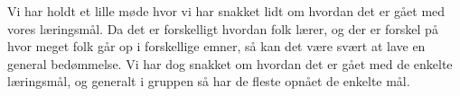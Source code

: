 Vi har holdt et lille m\o{}de hvor vi har snakket lidt om hvordan det er g\aa{}et med vores l\ae{}ringsm\aa{}l. Da det er forskelligt hvordan folk l\ae{}rer, og der er forskel p\aa{} hvor meget folk g\aa{}r op i forskellige emner, s\aa{} kan det v\ae{}re sv\ae{}rt at lave en general bed\o{}mmelse. Vi har dog snakket om hvordan det er g\aa{}et med de enkelte l\ae{}ringsm\aa{}l, og generalt i gruppen s\aa{} har de fleste opn\aa{}et de enkelte m\aa{}l.

\begin{comment}
I skal beskrive jeres arbejdsprocesser i P1 s\aa{} detaljeret som muligt indenfor de fire omr\aa{}der:
    •   Projektplanl\ae{}gning
    •   Gruppesamarbejde
    •   Samarbejde med vejledere
    •   L\ae{}reprocesser
Beskrivelsen kan eksempelvis give et overblik over udviklingen i jeres arbejdsprocesser, \ae{}ndringer
i processer undervejs, l\ae{}ringsm\aa{}l, forventningsafklaringer i gruppen og med vejleder, aktiviteter til
opf\o{}lgning af m\aa{}ls\ae{}tninger osv.


\subsection{Vurdering}

N\aa{}r I er f\ae{}rdige med at beskrive hvad I gjorde, skal I vurdere hvordan det efter jeres mening gik.
Eksempelvis kan i komme ind p\aa{}, hvordan i fulgte op p\aa{} gruppens beslutninger og m\aa{}ls\ae{}tninger og
i hvilket omfang jeres arbejdsprocesser indenfor de fire omr\aa{}der fungerede efter hensigten.


\subsection{Analyse}

Dern\ae{}st skal I analysere jeres arbejdsprocesser og f\aa{} klarlagt hvorfor noget gik godt mens andet gik
d\aa{}rligt. Med andre ord: Hvilke faktorer har indvirket p\aa{} arbejdsprocesserne, og hvordan h\aa{}ndterede
i de udfordringer der opstod undervejs?


\subsection{Syntese}

Hvis jeres vurdering og analyse skal bidrage til at forbedre jeres evne til at h\aa{}ndtere det
problemorienterede og projektorganiserede gruppearbejde, skal I til slut konkretisere jeres
erfaringer i nogle ’Gode r\aa{}d’ til jer selv og jeres medstuderende. En god m\aa{}de at formulere s\aa{}danne
gode r\aa{}d p\aa{} er som en ’start-stop-forts\ae{}t’-liste, dvs. en liste med f\o{}lgende tre sektioner:
    •   Dette vil vi begynde at g\o{}re i P2, som vi ikke gjorde i P1
    •   Dette vil vi ikke g\o{}re i P2, som vi gjorde i P1
    •   Dette vil vi forts\ae{}tte med at g\o{}re (gerne anderledes og bedre) i P2, som vi ogs\aa{} gjorde i P1
Det er en god idé at tage ét af de fire omr\aa{}der ad gangen og g\o{}re det f\ae{}rdigt. Husk hvad ang\aa{}r
strukturen at skelne klart mellem beskrivelse; vurdering og analyse og husk, at de ’Gode r\aa{}d’ skal
v\ae{}re konkrete og operationelle, s\aa{} de f\o{}rer til reelle forbedringer i P2.
\end{comment}